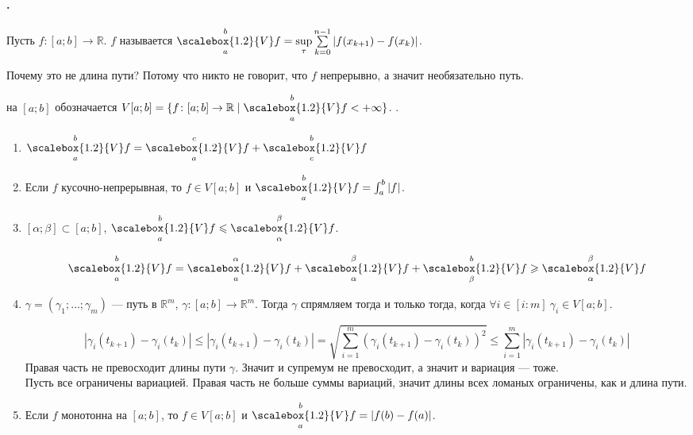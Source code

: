 \documentclass{article}
\newcommand*{\Var}[2]{{\overset{#2}{\underset{#1}{\scalebox{1.2}{V}}}}}
\begin{document}
    \paragraph{.}
    \begin{itemize}
        \dfn Пусть $f\colon[a;b]\to\mathbb R$.  $f$ называется $\Var abf=\sup\limits_\tau\sum\limits_{k=0}^{n-1}|f(x_{k+1})-f(x_k)|$.
        \begin{Comment}
            Почему это не длина пути? Потому что никто не говорит, что $f$ непрерывно, а значит необязательно путь.
        \end{Comment}
        \dfn {} на $[a;b]$ обозначается $V[a;b]=\{f\colon[a;b]\to\mathbb R\mid\Var abf<+\infty\}$.
        \thm {}.
        \begin{enumerate}
            \item $\Var abf=\Var acf+\Var cbf$
            \item Если $f$ кусочно-непрерывная, то $f\in V[a;b]$ и $\Var abf=\int_a^b|f|$.
            \item $[\alpha;\beta]\subset[a;b]$, $\Var abf\leqslant\Var\alpha\beta f$.
            \begin{Proof}
                \[
                \Var abf=\Var a\alpha f+\Var\alpha\beta f+\Var\beta bf\geqslant\Var\alpha\beta f
                \]
            \end{Proof}
            \item $\gamma=(\gamma_1;\ldots;\gamma_m)$ --- путь в $\mathbb R^m$, $\gamma\colon[a;b]\to\mathbb R^m$. Тогда $\gamma$ спрямляем тогда и только тогда, когда $\forall i\in[i:m]~\gamma_i\in V[a;b]$.
            \begin{Proof}
                \[
                |\gamma_i(t_{k+1})-\gamma_i(t_k)|\leqslant|\gamma_i(t_{k+1})-\gamma_i(t_k)|=\sqrt{\sum\limits_{i=1}^m(\gamma_i(t_{k+1})-\gamma_i(t_k))^2}\leqslant\sum\limits_{i=1}^m|\gamma_i(t_{k+1})-\gamma_i(t_k)|
                \]
                Правая часть не превосходит длины пути $\gamma$. Значит и супремум не превосходит, а значит и вариация --- тоже.\\
                Пусть все ограничены вариацией. Правая часть не больше суммы вариаций, значит длины всех ломаных ограничены, как и длина пути.
            \end{Proof}
            \item Если $f$ монотонна на $[a;b]$, то $f\in V[a;b]$ и $\Var abf=|f(b)-f(a)|$.

\end{enumerate}
\end{itemize}
\end{document}
